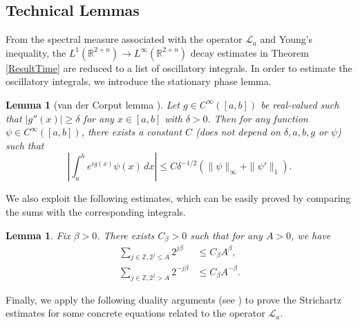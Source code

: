 \documentclass[a4paper,11pt, reqno]{amsart}
\numberwithin{equation}{section}
\theoremstyle{plain}
\newtheorem{lemma}[theorem]{Lemma}
\theoremstyle{definition}
\theoremstyle{remark}
\begin{document}
\subsection{Technical Lemmas} 
From the spectral measure associated with the operator $\mathcal{L}_a$ and Young's inequality, the $L^1(\mathbb{R}^{2+n})\to L^\infty(\mathbb{R}^{2+n})$ decay estimates in Theorem \ref{ResultTime} are reduced to a list of oscillatory integrals. In order to estimate the oscillatory integrals, we introduce the stationary phase lemma.
\begin{lemma}[van der Corput lemma \cite{S1993}]\label{phase} Let $g\in C^\infty([a,b])$ be real-valued such that $|g''(x)|\geq \delta $ for any $x\in[a,b]$ with $\delta >0$. Then for any function $\psi \in C^\infty([a,b])$, there exists a constant $C$ (does not depend on $\delta, a, b, g$ or $\psi$)  such that
	\begin{equation*}
	\left|\int_a^b e^{{ ig(x)}}\psi(x)\,dx\right|\leq C{ \delta ^{-1/2}}\left(\|\psi\|_\infty+\|\psi'\|_1\right).
	\end{equation*}
 \end{lemma}
We also exploit the following estimates, which can be easily proved by comparing the sums with the corresponding integrals.
\begin{lemma}\label{Sum}
Fix $\beta>0$. There exists $C_\beta>0$ such that for any $A>0$, we have
\begin{align*}
\sum_{j\in\mathbb{Z}, 2^j\leq A}2^{j\beta}&\leq C_\beta A^\beta,\\
\sum_{j\in\mathbb{Z}, 2^j>A}2^{-j\beta}&\leq C_\beta A^{-\beta}.
\end{align*}
\end{lemma}
Finally, we apply the following duality arguments (see \cite{GV}) to prove the Strichartz estimates for some concrete equations related to the operator $\mathcal{L}_a$.
\end{document}
